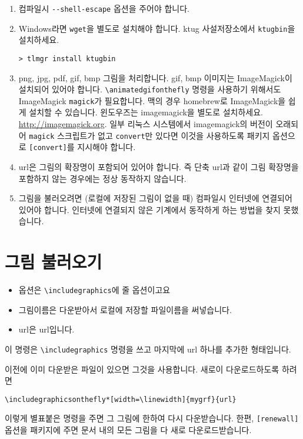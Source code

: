 \documentclass[b5paper,nanum]{oblivoir}
\def\cs#1{\texttt{\textbackslash #1}}
\begin{document}
\begin{enumerate}\firmlist
\item    컴파일시 \verb|--shell-escape| 옵션을 주어야 합니다.
\item    Windows라면 \texttt{wget}을 별도로 설치해야 합니다. ktug 사설저장소에서 \texttt{ktugbin}을 설치하세요.
\begin{verbatim}
> tlmgr install ktugbin
\end{verbatim}

\item   \marginpar{[v0.9.5]} png, jpg, pdf, gif, bmp 그림을 처리합니다. gif, bmp 이미지는 ImageMagick이 설치되어 있어야 합니다. \cs{animatedgifonthefly} 명령을 사용하기 위해서도 ImageMagick \verb|magick|가 필요합니다. 맥의 경우 homebrew로 ImageMagick을 쉽게 설치할 수 있습니다. 윈도우즈는 imagemagick을 별도로 설치하세요. \url{http://imagemagick.org}. 일부 리눅스 시스템에서 imagemagick의 버전이 오래되어 \texttt{magick} 스크립트가 없고 \texttt{convert}만 있다면 이것을 사용하도록 패키지 옵션으로 \texttt{[convert]}를 지시해야 합니다.

\item    url은 그림의 확장명이 포함되어 있어야 합니다. 즉 단축 url과 같이 그림 확장명을 포함하지 않는 경우에는 정상 동작하지 않습니다.
\item    그림을 불러오려면 (로컬에 저장된 그림이 없을 때) 컴파일시 인터넷에 연결되어 있어야 합니다. 인터넷에 연결되지 않은 기계에서 동작하게 하는 방법을 찾지 못했습니다.
\end{enumerate}

\section{그림 불러오기}

\begin{boxedverbatim}
\end{boxedverbatim}

\begin{itemize}\firmlist
\item 옵션은 \cs{includegraphics}에 줄 옵션이고요
\item 그림이름은 다운받아서 로컬에 저장할 파일이름을  써넣습니다.
\item url은 url입니다.
\end{itemize}

이 명령은 \cs{includegraphics} 명령을 쓰고 마지막에 url 하나를 추가한 형태입니다.

이전에 이미 다운받은 파일이 있으면 그것을 사용합니다.
새로이 다운로드하도록 하려면
\begin{verbatim}
\includegraphicsonthefly*[width=\linewidth]{mygrf}{url}
\end{verbatim}
이렇게 별표붙은 명령을 주면 그 그림에 한하여 다시 다운받습니다.
한편, \texttt{[renewall]} 옵션을 패키지에 주면 문서 내의 모든 그림을 다 새로 다운로드받습니다.
\end{document}
